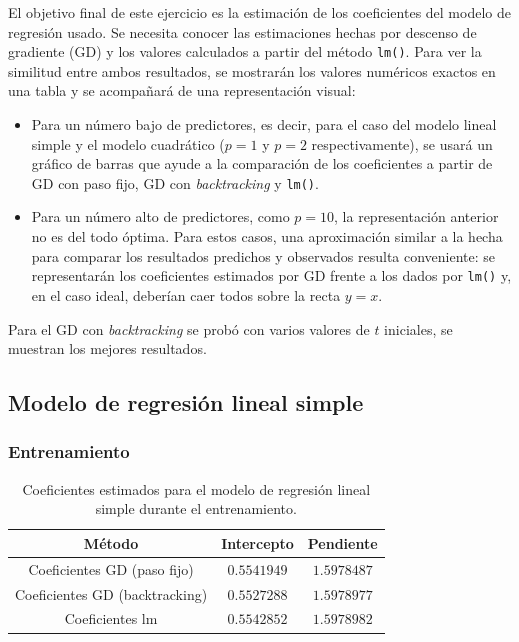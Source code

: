 \documentclass[11pt]{opticajnl}
\begin{document}
El objetivo final de este ejercicio es la estimación de los coeficientes del modelo de regresión usado. Se necesita conocer las estimaciones hechas por descenso de gradiente (GD) y los valores calculados a partir del método \texttt{lm()}. Para ver la similitud entre ambos resultados, se mostrarán los valores numéricos exactos en una tabla y se acompañará de una representación visual:
\begin{itemize}
\item Para un número bajo de predictores, es decir, para el caso del modelo lineal simple y el modelo cuadrático ($p = 1$ y $p = 2$ respectivamente), se usará un gráfico de barras que ayude a la comparación de los coeficientes a partir de GD con paso fijo, GD con \textit{backtracking} y \texttt{lm()}. 
\item Para un número alto de predictores, como $p = 10$, la representación anterior no es del todo óptima. Para estos casos, una aproximación similar a la hecha para comparar los resultados predichos y observados resulta conveniente: se representarán los coeficientes estimados por GD frente a los dados por \texttt{lm()} y, en el caso ideal, deberían caer todos sobre la recta $y = x$.
\end{itemize}

\noindent Para el GD con \textit{backtracking} se probó con varios valores de $t$ iniciales, se muestran los mejores resultados. 

\subsection{Modelo de regresión lineal simple}

\subsubsection{Entrenamiento}

\begin{table}[h]
    \centering
    \begin{tabular}{ccc}
    \hline
    \textbf{Método} & \textbf{Intercepto} & \textbf{Pendiente} \\
    \hline
    Coeficientes GD (paso fijo) & $0.5541949$ & $1.5978487$ \\
    Coeficientes GD (backtracking) & $0.5527288$ & $1.5978977$ \\
    Coeficientes lm & $0.5542852$ & $1.5978982$ \\
    \hline
    \end{tabular}
    \caption{Coeficientes estimados para el modelo de regresión lineal simple durante el entrenamiento.}
    \label{tab:mrs}
\end{table}
\end{document}
